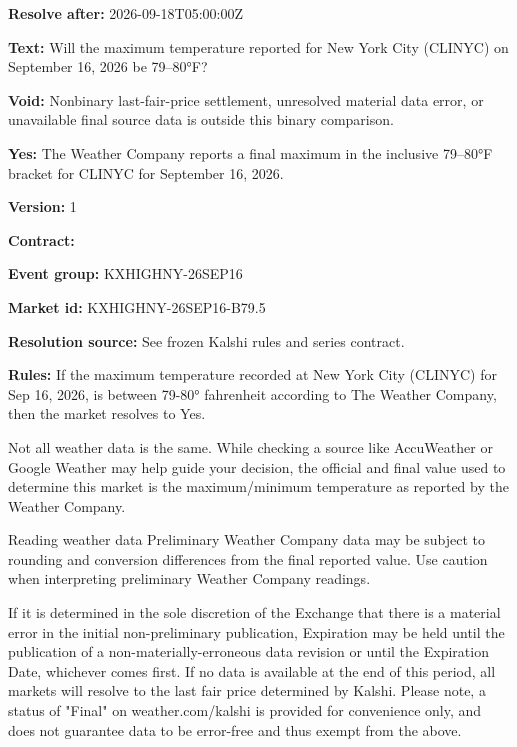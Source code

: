 \documentclass[11pt]{article}
\begin{document}
\par\noindent\textbf{Resolve after:} 2026-09-18T05:00:00Z

\par\noindent\textbf{Text:} Will the maximum temperature reported for New York City (CLINYC) on September 16, 2026 be 79–80°F?

\par\noindent\textbf{Void:} Nonbinary last-fair-price settlement, unresolved material data error, or unavailable final source data is outside this binary comparison.

\par\noindent\textbf{Yes:} The Weather Company reports a final maximum in the inclusive 79–80°F bracket for CLINYC for September 16, 2026.

\par\noindent\textbf{Version:} 1

\par\noindent\textbf{Contract:} \par \par\noindent\textbf{Event group:} KXHIGHNY-26SEP16

\par\noindent\textbf{Market id:} KXHIGHNY-26SEP16-B79.5

\par\noindent\textbf{Resolution source:} See frozen Kalshi rules and series contract.

\par\noindent\textbf{Rules:} If the maximum temperature recorded at New York City (CLINYC) for Sep 16, 2026, is between 79-80° fahrenheit according to The Weather Company, then the market resolves to Yes.

Not all weather data is the same. While checking a source like AccuWeather or Google Weather may help guide your decision, the official and final value used to determine this market is the maximum/minimum temperature as reported by the Weather Company.

Reading weather data
Preliminary Weather Company data may be subject to rounding and conversion differences from the final reported value.
Use caution when interpreting preliminary Weather Company readings.

If it is determined in the sole discretion of the Exchange that there is a material error in the initial non-preliminary publication, Expiration may be held until the publication of a non-materially-erroneous data revision or until the Expiration Date, whichever comes first. If no data is available at the end of this period, all markets will resolve to the last fair price determined by Kalshi. Please note, a status of "Final" on weather.com/kalshi is provided for convenience only, and does not guarantee data to be error-free and thus exempt from the above.
\end{document}
